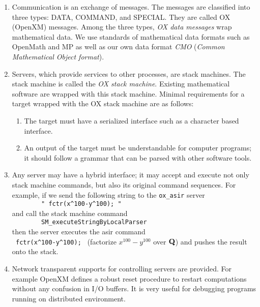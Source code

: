 \documentclass{slides}
\begin{document}
\begin{enumerate}
\item Communication is an exchange of messages. The messages are classified into
three types:
DATA, COMMAND, and SPECIAL.
They are called OX (OpenXM) messages.
Among the three types,
{\it OX data messages} wrap mathematical data.
We use standards of mathematical data formats such as OpenMath and MP
as well as our own data format {\it CMO}
({\it Common Mathematical Object format}).
\item Servers, which provide services to other processes, are stack machines.
The stack machine is called the
{\it OX stack machine}.
Existing mathematical software are wrapped with this stack machine.
Minimal requirements for a target wrapped with the OX stack machine
are as follows:
\begin{enumerate}
\item The target must have a serialized interface such as a character based
interface.
\item An output of the target must be understandable for computer programs;
it should follow a grammar that can be parsed with other software tools.
\end{enumerate}
\item Any server may have a hybrid interface;
it may accept and execute not only stack machine commands, 
but also its original command sequences.
For example,
if we send the following string to the {\tt ox\_asir} server  \\
\verb+        " fctr(x^100-y^100); "      + \\
and call the stack machine command  \\
\verb+        SM_executeStringByLocalParser    + \\ 
then the server executes the asir command \\
\verb+ fctr(x^100-y^100); + 
(factorize $x^{100}-y^{100}$ over ${\bf Q}$)
and pushes the result onto the stack.
\item Network transparent supports for controlling servers are provided.
For example OpenXM defines a robust reset procedure to restart computations
without any confusion in I/O buffers.
It is very useful for debugging programs running on distributed environment.
\end{enumerate}

\newpage
\end{document}
